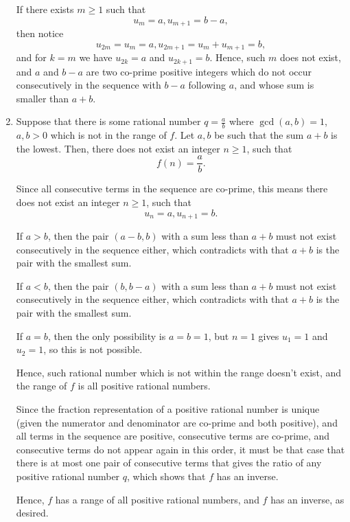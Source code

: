 \begin{enumerate}
          If there exists \(m \geq 1\) such that
          \[
              u_{m} = a,  u_{m + 1} = b - a,
          \]
          then notice
          \[
              u_{2m} = u_{m} = a, u_{2m + 1} = u_{m} + u_{m + 1} = b,
          \]
          and for \(k = m\) we have \(u_{2k} = a\) and \(u_{2k + 1} = b\). Hence, such \(m\) does not exist, and \(a\) and \(b - a\) are two co-prime positive integers which do not occur consecutively in the sequence with \(b - a\) following \(a\), and whose sum is smaller than \(a + b\).

    \item Suppose that there is some rational number \(q = \frac{a}{b}\) where \(\gcd(a, b) = 1\), \(a, b > 0\) which is not in the range of \(f\). Let \(a, b\) be such that the sum \(a + b\) is the lowest. Then, there does not exist an integer \(n \geq 1\), such that
          \[
              f(n) = \frac{a}{b}.
          \]

          Since all consecutive terms in the sequence are co-prime, this means there does not exist an integer \(n \geq 1\), such that
          \[
              u_n = a, u_{n + 1} = b.
          \]

          If \(a > b\), then the pair \((a - b, b)\) with a sum less than \(a + b\) must not exist consecutively in the sequence either, which contradicts with that \(a + b\) is the pair with the smallest sum.

          If \(a < b\), then the pair \((b, b - a)\) with a sum less than \(a + b\) must not exist consecutively in the sequence either, which contradicts with that \(a + b\) is the pair with the smallest sum.

          If \(a = b\), then the only possibility is \(a = b = 1\), but \(n = 1\) gives \(u_1 = 1\) and \(u_2 = 1\), so this is not possible.

          Hence, such rational number which is not within the range doesn't exist, and the range of \(f\) is all positive rational numbers.

          Since the fraction representation of a positive rational number is unique (given the numerator and denominator are co-prime and both positive), and all terms in the sequence are positive, consecutive terms are co-prime, and consecutive terms do not appear again in this order, it must be that case that there is at most one pair of consecutive terms that gives the ratio of any positive rational number \(q\), which shows that \(f\) has an inverse.

          Hence, \(f\) has a range of all positive rational numbers, and \(f\) has an inverse, as desired.
\end{enumerate}